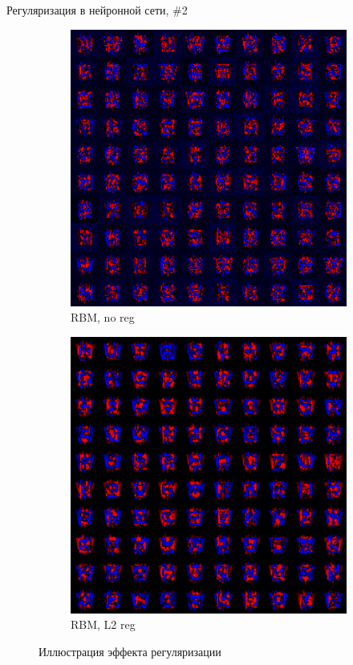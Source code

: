 \documentclass[10pt]{beamer}
\begin{document}
\begin{frame}{Регуляризация в нейронной сети, \#2}

\begin{figure}
        \centering
        \begin{subfigure}[b]{0.5\textwidth}
                \includegraphics[width=1\textwidth]{images/rbm_colmap_noreg.png}
                \caption{RBM, no reg}                
        \end{subfigure}%
        \begin{subfigure}[b]{0.5\textwidth}
                \includegraphics[width=1\textwidth]{images/rbm_colmap_l2.png}
                \caption{RBM, L2 reg}                
        \end{subfigure}       
        \caption{Иллюстрация эффекта регуляризации}
\end{figure}


\end{frame}
\end{document}
